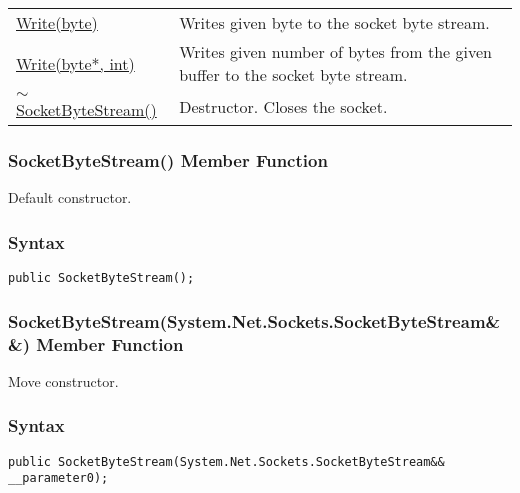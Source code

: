 \documentclass[a4paper,oneside,11.000000pt]{book}
\begin{document}
\begin{flushleft}
\begin{supertabular}[l]{!{\raggedright}p{7.575cm}!{\raggedright}p{7.575cm}}
\\
\hyperlink{System.Net.Sockets.SocketByteStream.Write.P.System.Net.Sockets.SocketByteStream.byte}{Write(byte)}
& Writes given byte to the socket byte stream.

\\
\hyperlink{System.Net.Sockets.SocketByteStream.Write.P.System.Net.Sockets.SocketByteStream.P.byte.int}{Write(byte*, int)}
& Writes given number of bytes from the given buffer to the socket byte stream.

\\
\hyperlink{System.Net.Sockets.SocketByteStream.destructor.P.System.Net.Sockets.SocketByteStream}{$\sim$SocketByteStream()}
& Destructor. Closes the socket.

\\
\end{supertabular}

\end{flushleft}
\clearpage

\hypertarget{System.Net.Sockets.SocketByteStream.constructor.P.System.Net.Sockets.SocketByteStream}{\subsubsection*{SocketByteStream() Member Function}}\begin{flushleft}
Default constructor.

\end{flushleft}
\subsubsection*{Syntax}
\texttt{public SocketByteStream();}
\clearpage

\hypertarget{System.Net.Sockets.SocketByteStream.constructor.P.System.Net.Sockets.SocketByteStream.RR.System.Net.Sockets.SocketByteStream}{\subsubsection*{SocketByteStream(System.Net.Sockets.SocketByteStream\&\&) Member Function}}\begin{flushleft}
Move constructor.

\end{flushleft}
\subsubsection*{Syntax}
\texttt{public SocketByteStream(System.Net.Sockets.SocketByteStream\&\& \_\_parameter0);}
\end{document}
